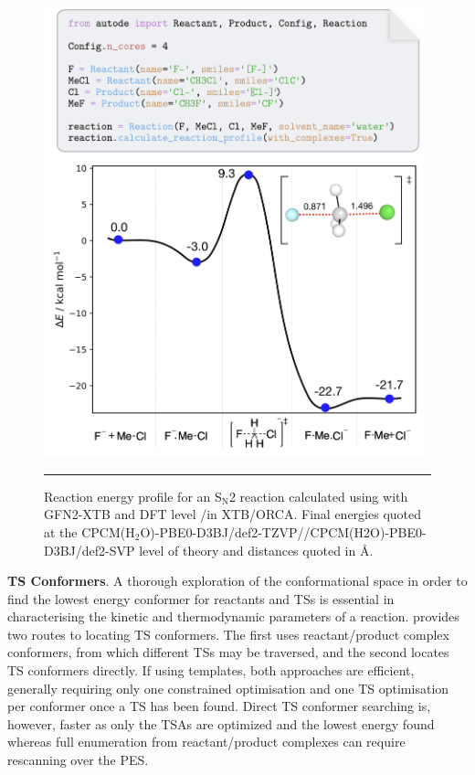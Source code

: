\documentclass[../../main.tex]{subfiles}
\begin{document}
\begin{figure}[h!]
	\vspace{0.4cm}
	\centering
	\includegraphics[width=11cm]{5/autode/figs/fig5}
	\vspace{0.4cm}
	\hrule
	\caption{Reaction energy profile for an S$_\text{N}$2 reaction calculated using \ade with GFN2-XTB and DFT level \lmethod/\hmethod in XTB/ORCA. Final energies quoted at the CPCM(H$_2$O)-PBE0-D3BJ/def2-TZVP//CPCM(H2O)-PBE0-D3BJ/def2-SVP level of theory and distances quoted in \AA.}
	\label{fig::ade_5}
\end{figure}

{\bfseries{TS Conformers}}. A thorough exploration of the conformational space in order to find the lowest energy conformer for reactants and TSs is essential in characterising the kinetic and thermodynamic parameters of a reaction. \ade provides two routes to locating TS conformers. The first uses reactant/product complex conformers, from which different TSs may be traversed, and the second locates TS conformers directly. If using templates, both approaches are efficient, generally requiring only one constrained optimisation and one TS optimisation per conformer once a TS has been found. Direct TS conformer searching is, however, faster as only the TSAs are optimized and the lowest energy found whereas full enumeration from reactant/product complexes can require rescanning over the PES.
\end{document}
